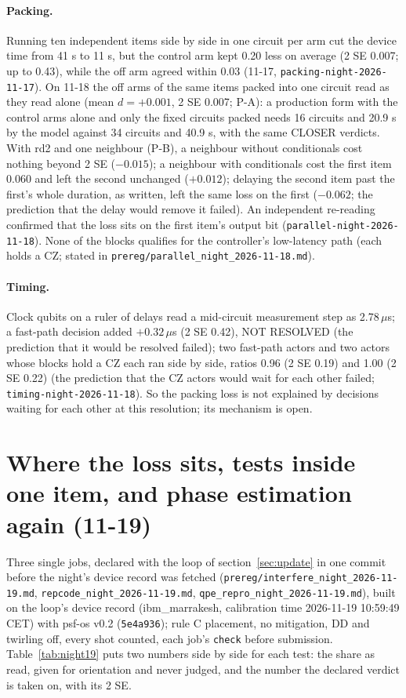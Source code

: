 \documentclass[10pt,a4paper]{article}
\begin{document}
\paragraph{Packing.} Running ten independent items side by side in one circuit per arm cut the device time from 41 s to
11 s, but the control arm kept 0.20 less on average (2 SE 0.007; up to 0.43), while the off arm agreed within 0.03
(11-17, \texttt{packing-night-2026-11-17}). On 11-18 the off arms of the same items packed into one circuit read as they
read alone (mean $d = +0.001$, 2 SE 0.007; P-A): a production form with the control arms alone and only the fixed
circuits packed needs 16 circuits and 20.9 s by the model against 34 circuits and 40.9 s, with the same CLOSER verdicts.
With rd2 and one neighbour (P-B), a neighbour without conditionals cost nothing beyond 2 SE ($-0.015$); a neighbour with
conditionals cost the first item 0.060 and left the second unchanged ($+0.012$); delaying the second item past the first's
whole duration, as written, left the same loss on the first ($-0.062$; the prediction that the delay would remove it
failed). An independent re-reading confirmed that the loss sits on the first item's output bit
(\texttt{parallel-night-2026-11-18}). None of the blocks qualifies for the controller's low-latency path (each holds a
CZ; stated in \texttt{prereg/parallel\_night\_2026-11-18.md}).

\paragraph{Timing.} Clock qubits on a ruler of delays read a mid-circuit measurement step as 2.78\,$\mu$s; a fast-path
decision added $+0.32\,\mu$s (2 SE 0.42), NOT RESOLVED (the prediction that it would be resolved failed); two
fast-path actors and two actors whose blocks hold a CZ each ran side by side, ratios 0.96 (2 SE 0.19) and 1.00 (2 SE 0.22)
(the prediction that the CZ actors would wait for each other failed; \texttt{timing-night-2026-11-18}). So the packing
loss is not explained by decisions waiting for each other at this resolution; its mechanism is open.

\section{Where the loss sits, tests inside one item, and phase estimation again (11-19)}\label{sec:night19}
Three single jobs, declared with the loop of section~\ref{sec:update} in one commit before the night's device record was
fetched (\texttt{prereg/interfere\_night\_2026-11-19.md}, \texttt{repcode\_night\_2026-11-19.md},
\texttt{qpe\_repro\_night\_2026-11-19.md}), built on the loop's device record (ibm\_marrakesh, calibration time
2026-11-19 10:59:49 CET) with psf-os v0.2 (\texttt{5e4a936}); rule C placement, no mitigation, DD and twirling off, every
shot counted, each job's \texttt{check} before submission. Table~\ref{tab:night19} puts two numbers side by side for
each test: the share as read, given for orientation and never judged, and the number the declared verdict is taken on,
with its 2 SE.
\end{document}
